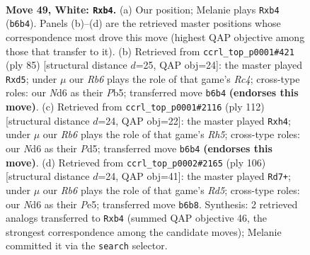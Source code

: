 \documentclass[11pt]{article}
\begin{document}
\clearpage

\begin{figure}[p]\centering
\begin{subfigure}{0.46\textwidth}\centering
\resizebox{\linewidth}{!}{%
\newchessgame
\chessboard[
  setfen={7k/6p1/1R1Npp2/7p/1p1P1P1P/2r1P1P1/6K1/8 w - - 6 49},
  showmover=false,
  pgfstyle=straightmove, color=movearrow, markmove={b6-b4}
]}
\caption{}
\end{subfigure}\hfill
\begin{subfigure}{0.46\textwidth}\centering
\resizebox{\linewidth}{!}{%
\newchessgame
\chessboard[
  setfen={4k3/R4p1p/6p1/1prP4/p7/P1P3P1/1P5P/5K2 b - - 4 43},
  showmover=false,
  pgfstyle=straightmove, color=movearrow, markmove={c5-d5}
]}
\caption{}
\end{subfigure}
\\[4pt]
\begin{subfigure}{0.46\textwidth}\centering
\resizebox{\linewidth}{!}{%
\newchessgame
\chessboard[
  setfen={8/8/1p1p1k2/2pP3R/P1P3Pp/1P6/1r6/6K1 w - - 3 57},
  showmover=false,
  pgfstyle=straightmove, color=movearrow, markmove={h5-h4}
]}
\caption{}
\end{subfigure}\hfill
\begin{subfigure}{0.46\textwidth}\centering
\resizebox{\linewidth}{!}{%
\newchessgame
\chessboard[
  setfen={8/6k1/1p4p1/p2RPp2/P1r2P1p/4PK1P/1P6/8 w - - 6 54},
  showmover=false,
  pgfstyle=straightmove, color=movearrow, markmove={d5-d7}
]}
\caption{}
\end{subfigure}
\caption{\textbf{Move 49, White: \texttt{Rxb4}.} (a) Our position; Melanie plays \texttt{Rxb4} (\texttt{b6b4}). Panels (b)--(d) are the retrieved master positions whose correspondence most drove this move (highest QAP objective among those that transfer to it). (b) Retrieved from \texttt{ccrl\_top\_p0001\#421} (ply 85) [structural distance $d$=25, QAP obj=24]: the master played \texttt{Rxd5}; under $\mu$ our \emph{Rb6} plays the role of that game's \emph{Rc4}; cross-type roles: our \emph{N}d6 as their \emph{P}b5; transferred move \texttt{b6b4} \textbf{(endorses this move)}. (c) Retrieved from \texttt{ccrl\_top\_p0001\#2116} (ply 112) [structural distance $d$=24, QAP obj=22]: the master played \texttt{Rxh4}; under $\mu$ our \emph{Rb6} plays the role of that game's \emph{Rh5}; cross-type roles: our \emph{N}d6 as their \emph{P}d5; transferred move \texttt{b6b4} \textbf{(endorses this move)}. (d) Retrieved from \texttt{ccrl\_top\_p0002\#2165} (ply 106) [structural distance $d$=24, QAP obj=41]: the master played \texttt{Rd7+}; under $\mu$ our \emph{Rb6} plays the role of that game's \emph{Rd5}; cross-type roles: our \emph{N}d6 as their \emph{P}e5; transferred move \texttt{b6b8}. Synthesis: 2 retrieved analogs transferred to \texttt{Rxb4} (summed QAP objective 46, the strongest correspondence among the candidate moves); Melanie committed it via the \texttt{search} selector.}
\label{fig:thought-m96}
\end{figure}
\end{document}
